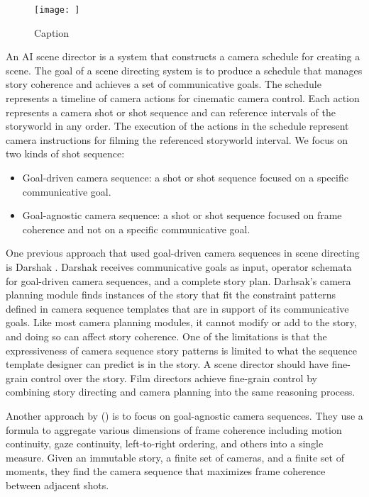 \documentclass[letterpaper]{article}
\begin{document}
\begin{figure}[b]
    \centering
    \texttt{[image: ]}
    \caption{Caption}
    \label{fig:bondsequence}
\end{figure}

An AI scene director is a system that constructs a camera schedule for creating a scene. The goal of a scene directing system is to produce a schedule that manages story coherence and achieves a set of communicative goals. The schedule represents a timeline of camera actions for cinematic camera control. Each action represents a camera shot or shot sequence and can reference intervals of the storyworld in any order. The execution of the actions in the schedule represent camera instructions for filming the referenced storyworld interval. We focus on two kinds of shot sequence:

\begin{itemize}
    \item Goal-driven camera sequence: a shot or shot sequence focused on a specific communicative goal.
    \item Goal-agnostic camera sequence: a shot or shot sequence focused on frame coherence and not on a specific communicative goal.
\end{itemize}


One previous approach that used goal-driven camera sequences in scene directing is Darshak \cite{jhala2010cinematic}. Darshak receives communicative goals as input, operator schemata for goal-driven camera sequences, and a complete story plan. Darhsak's camera planning module finds instances of the story that fit the constraint patterns defined in camera sequence templates that are in support of its communicative goals. Like most camera planning modules, it cannot modify or add to the story, and doing so can affect story coherence. One of the limitations is that the expressiveness of camera sequence story patterns is limited to what the sequence template designer can predict is in the story. A scene director should have fine-grain control over the story. Film directors achieve fine-grain control by combining story directing and camera planning into the same reasoning process. 

Another approach by \citeauthor{galvane2015continuity} (\citeyear{galvane2015continuity}) is to focus on goal-agnostic camera sequences. They use a formula to aggregate various dimensions of frame coherence including motion continuity, gaze continuity, left-to-right ordering, and others into a single measure. Given an immutable story, a finite set of cameras, and a finite set of moments, they find the camera sequence that maximizes frame coherence between adjacent shots.
\end{document}
